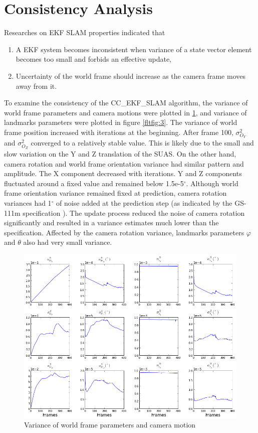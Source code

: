\section{Consistency Analysis}\label{sec:flight-consistency}
Researches on EKF SLAM properties indicated that 
\begin{enumerate}
  \item A EKF system becomes inconsistent when variance of a state
  vector element becomes too small and forbids an effective update,
  \item Uncertainty of the world frame should increase as the
  camera frame moves away from it.
\end{enumerate}

To examine the consistency of the CC\_EKF\_SLAM algorithm, the
variance of world frame parameters and camera motions were plotted in
\ref{fltfig:120}, and variance of landmarks parameters were plotted in
figure \ref{fltfig:3}. The variance of world frame position increased
with iterations at the beginning. After frame 100, $\sigma^2_{O_Y}$
and $\sigma^2_{O_Z}$ converged to a relatively stable value. This is
likely due to the small and slow variation on the Y and Z translation
of the SUAS. On the other hand, camera rotation and world frame
orientation variance had similar pattern and amplitude. The X
component decreased with iterations. Y and Z components fluctuated
around a fixed value and remained below 1.5e-5$^\circ$. Although world
frame orientation variance remained fixed at prediction, camera
rotation variances had 1$^\circ$ of noise added at the prediction step (as
indicated by the GS-111m specification \cite{_athena_????}). The
update process reduced the noise of camera rotation significantly and
resulted in a variance estimates much lower than the specification.
Affected by the camera rotation variance, landmarks parameters
$\varphi$ and $\theta$ also had very small variance.


\begin{figure}[h]
\centering
\includegraphics[width=14cm, keepaspectratio=true]
{./Figures/fltfig/cut1/Figure120.png}
\caption{Variance of world frame parameters and camera motion}
\label{fltfig:120}
\end{figure}


